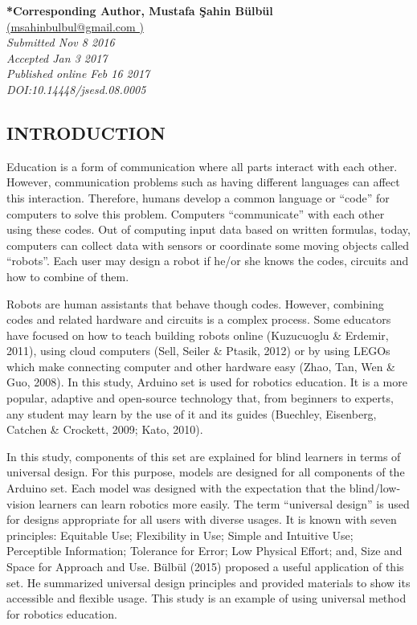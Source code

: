 \documentclass[11.5pt]{sig-alternate} %
\begin{document}
\textbf{*Corresponding Author, Mustafa Şahin Bülbül}\\
\href{mailto:  msahinbulbul@gmail.com }{(msahinbulbul@gmail.com )} \\
\textit{Submitted  Nov 8 2016 }\\
\textit{Accepted  Jan 3 2017} \\
\textit{Published online  Feb 16 2017} \\
\textit{DOI:10.14448/jsesd.08.0005} \\
\pagebreak
\clearpage
\begin{large}
\section*{INTRODUCTION}

Education is a form of communication where all parts interact with each other.  However, communication problems such as having different languages can affect this interaction.  Therefore, humans develop a common language or “code” for computers to solve this problem.  Computers “communicate” with each other using these codes.  Out of computing input data based on written formulas, today, computers can collect data with sensors or coordinate some moving objects called “robots”.  Each user may design a robot if he/or she knows the codes, circuits and how to combine of them. 

Robots are human assistants that behave though codes.  However, combining codes and related hardware and circuits is a complex process. Some educators have focused on how to teach building robots online (Kuzucuoglu \& Erdemir, 2011), using cloud computers (Sell, Seiler \& Ptasik, 2012) or by using LEGOs which make connecting computer and other hardware easy (Zhao, Tan, Wen \& Guo, 2008).  In this study, Arduino set is used for robotics education.  It is a more popular, adaptive and open-source technology that, from beginners to experts, any student may learn by the use of it and its guides (Buechley, Eisenberg, Catchen \& Crockett, 2009; Kato, 2010). 
 
In this study, components of this set are explained for blind learners in terms of universal design.  For this purpose, models are designed for all components of the Arduino set.  Each model was designed with the expectation that the blind/low-vision learners can learn robotics more easily.  The term “universal design” is used for designs appropriate for all users with diverse usages.  It is known with seven principles: Equitable Use; Flexibility in Use; Simple and Intuitive Use; Perceptible Information; Tolerance for Error; Low Physical Effort; and, Size and Space for Approach and Use.  Bülbül (2015) proposed a useful application of this set.  He summarized universal design principles and provided materials to show its accessible and flexible usage.  This study is an example of using universal method for robotics education.


\end{large}
\end{document}
